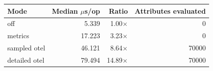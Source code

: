 \begin{tabular}{lrrr}
\toprule
Mode & Median $\mu$s/op & Ratio & Attributes evaluated \\
\midrule
off & 5.339 & 1.00$\times$ & 0 \\
metrics & 17.223 & 3.23$\times$ & 0 \\
sampled otel & 46.121 & 8.64$\times$ & 70000 \\
detailed otel & 79.494 & 14.89$\times$ & 70000 \\
\bottomrule
\end{tabular}
